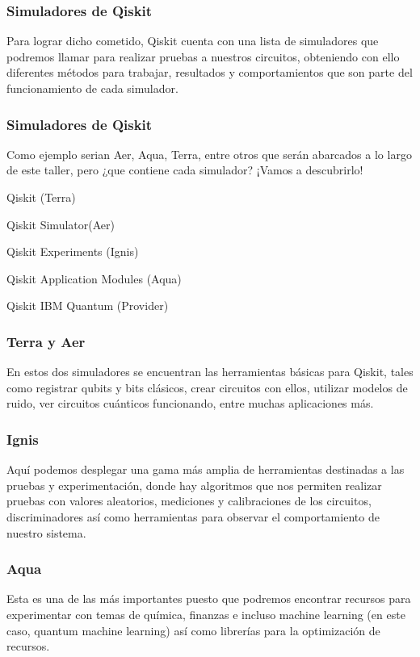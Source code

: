 \documentclass[spanish]{beamer}
\begin{document}
\newpage\justify\setlength{\parskip}{5mm}
\begin{frame}\frametitle{Simuladores de Qiskit} 
Para lograr dicho cometido, Qiskit cuenta con una lista de simuladores que podremos llamar para realizar pruebas a nuestros circuitos, obteniendo con ello diferentes métodos para trabajar, resultados y comportamientos que son parte del funcionamiento de cada simulador. 
\end{frame} 

\newpage\justify\setlength{\parskip}{5mm}
\begin{frame}\frametitle{Simuladores de Qiskit} 
Como ejemplo serian Aer, Aqua, Terra, entre otros que serán abarcados a lo largo de este taller, pero ¿que contiene cada simulador? ¡Vamos a descubrirlo!
\begin{itemsize}
\item Qiskit (Terra)
    \item Qiskit Simulator(Aer)
    \item Qiskit Experiments (Ignis)
    \item Qiskit Application Modules (Aqua)
    \item Qiskit IBM Quantum (Provider)
\end{itemsize}
\end{frame} 

\newpage\justify\setlength{\parskip}{5mm}
\begin{frame}\frametitle{Terra y Aer} 
En estos dos simuladores se encuentran las herramientas básicas para Qiskit, tales como registrar qubits y bits clásicos, crear circuitos con ellos, utilizar modelos de ruido, ver circuitos cuánticos funcionando, entre muchas aplicaciones más.
\end{frame} 

\newpage\justify\setlength{\parskip}{5mm}
\begin{frame}\frametitle{Ignis} 
Aquí podemos desplegar una gama más amplia de herramientas destinadas a las pruebas y experimentación, donde hay algoritmos que nos permiten realizar pruebas con valores aleatorios, mediciones y calibraciones de los circuitos, discriminadores  así como herramientas para observar el comportamiento de nuestro sistema.
\end{frame} 

\newpage\justify\setlength{\parskip}{5mm}
\begin{frame}\frametitle{Aqua} 
Esta es una de las más importantes puesto que podremos encontrar recursos para experimentar con temas de química, finanzas e incluso machine learning (en este caso, quantum machine learning) así como librerías para la optimización de recursos.
\end{frame} 
\end{document}
